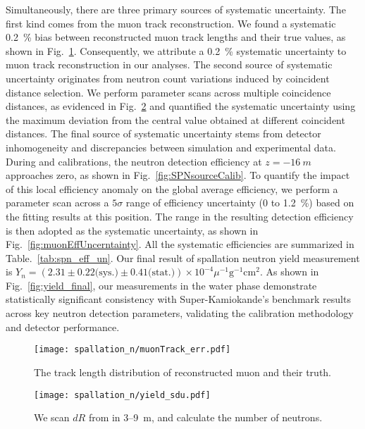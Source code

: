 Simultaneously, there are three primary sources of systematic uncertainty. The first kind comes from the muon track reconstruction. We found a systematic \SI{0.2}{\%} bias between reconstructed muon track lengths and their true values, as shown in Fig.~\ref{fig:muontrackUncerntainty}. Consequently, we attribute a \SI{0.2}{\%} systematic uncertainty to muon track reconstruction in our analyses.
The second source of systematic uncertainty originates from neutron count variations induced by coincident distance selection. We perform parameter scans across multiple coincidence distances, as evidenced in Fig.~\ref{fig:muonCountUncerntainty} and quantified the systematic uncertainty using the maximum deviation from the central value obtained at different coincident distances.
The final source of systematic uncertainty stems from detector inhomogeneity and discrepancies between simulation and experimental data. During  and  calibrations, the neutron detection efficiency at $z = \SI{-16}{m}$ approaches zero, as shown in Fig.~\ref{fig:SPNsourceCalib}. To quantify the impact of this local efficiency anomaly on the global average efficiency, we perform a parameter scan across a $5\sigma$ range of efficiency uncertainty (0 to \SI{1.2}{\%}) based on the fitting results at this position. The range in the resulting detection efficiency is then adopted as the systematic uncertainty, as shown in Fig.~\ref{fig:muonEffUncerntainty}. All the systematic efficiencies are summarized in Table.~\ref{tab:spn_eff_un}. Our final result of spallation neutron yield measurement is $Y_n = (2.31\pm0.22\text{(sys.)}\pm0.41 \text{(stat.)}) \times 10^{-4}\mu^{-1}\text{g}^{-1}\text{cm}^2$. As shown in Fig.~\ref{fig:yield_final}, our measurements in the water phase demonstrate statistically significant consistency with Super-Kamiokande's benchmark results across key neutron detection parameters, validating the calibration methodology and detector performance.
\begin{figure}[htbp]
	\centering
	\texttt{[image: spallation\_n/muonTrack\_err.pdf]}
	\caption{The track length distribution of reconstructed muon and their truth.}
	\label{fig:muontrackUncerntainty}
\end{figure}

\begin{figure}[htbp]
	\centering
	\texttt{[image: spallation\_n/yield\_sdu.pdf]}
	\caption{We scan $dR$ from in 3--\SI{9}{m}, and calculate the number of neutrons.}
	\label{fig:muonCountUncerntainty}
\end{figure}

